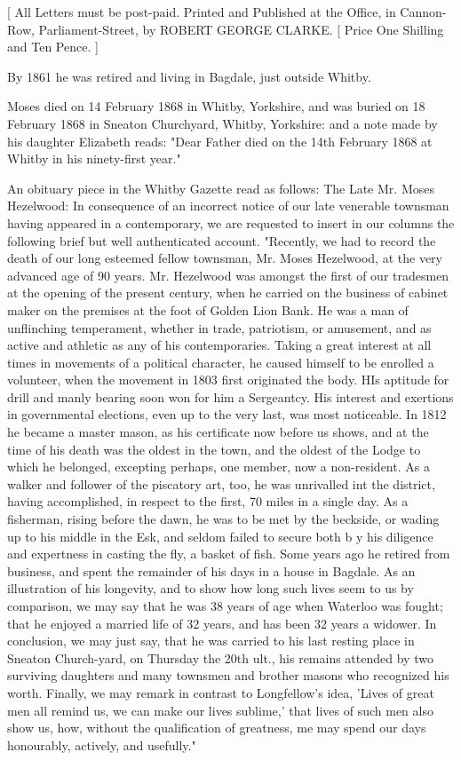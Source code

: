 [ All Letters must be post-paid. Printed and Published at the Office, in Cannon-Row, Parliament-Street, by ROBERT GEORGE CLARKE. [ Price One Shilling and Ten Pence. ] \cite{MHazelwoodBankruptcy}

By 1861 he was retired and living in Bagdale, just outside Whitby. \cite{MHezelwood1861}

Moses died on 14 February 1868 in Whitby, Yorkshire, and was buried on 18 February 1868 in Sneaton Churchyard,	Whitby, Yorkshire: \cite{MHezelwoodDeath} and a note made by his daughter Elizabeth reads: "Dear Father died on the 14th February 1868 at Whitby in his ninety-first year." 

An obituary piece in the Whitby Gazette read as follows:
The Late Mr. Moses Hezelwood:
In consequence of an incorrect notice of our late venerable townsman having appeared in a contemporary, we are requested to insert in our columns the following brief but well authenticated account.
"Recently, we had to record the death of our long esteemed fellow townsman, Mr. Moses Hezelwood, at the very advanced age of 90 years. Mr. Hezelwood was amongst the first of our tradesmen at the opening of the present century, when he carried on the business of cabinet maker on the premises at the foot of Golden Lion Bank. He was a man of unflinching temperament, whether in trade, patriotism, or amusement, and as active and athletic as any of his contemporaries. Taking a great interest at all times in movements of a political character, he caused himself to be enrolled a volunteer, when the movement in 1803 first originated the body. HIs aptitude for drill and manly bearing soon won for him a Sergeantcy. His interest and exertions in governmental elections, even up to the very last, was most noticeable. In 1812 he became a master mason, as his certificate now before us shows, and at the time of his death was the oldest in the town, and the oldest of the Lodge to which he belonged, excepting perhaps, one member, now a non-resident. As a walker and follower of the piscatory art, too, he was unrivalled int the district, having accomplished, in respect to the first, 70 miles in a single day. As a fisherman, rising before the dawn, he was to be met by the beckside, or wading up to his middle in the Esk, and seldom failed to secure both b y his diligence and expertness in casting the fly, a basket of fish. Some years ago he retired from business, and spent the remainder of his days in a house in Bagdale. As an illustration of his longevity, and to show how long such lives seem to us by comparison, we may say that he was 38 years of age when Waterloo was fought; that he enjoyed a married life of 32 years, and has been 32 years a widower. In conclusion, we may just say, that he was carried to his last resting place in Sneaton Church-yard, on Thursday the 20th ult., his remains attended by two surviving daughters and many townsmen and brother masons who recognized his worth. Finally, we may remark in contrast to Longfellow's idea, 'Lives of great men all remind us, we can make our lives sublime,' that lives of such men also show us, how, without the qualification of greatness, me may spend our days honourably, actively, and usefully." \cite{MHezelwoodDeathnotice}
